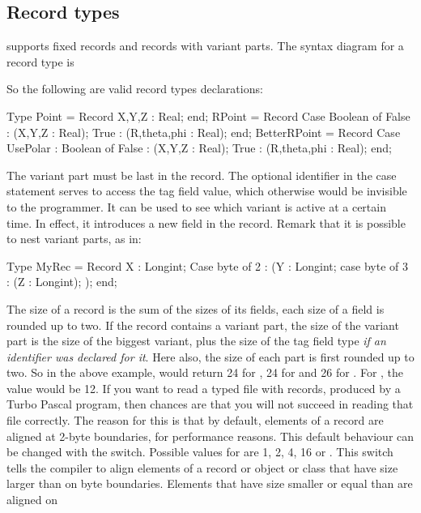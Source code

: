 \documentclass{report}
\begin{document}
\subsection{Record types}
\fpc supports fixed records and records with variant parts. 
The syntax diagram for a record type is

So the following are valid record types declarations:
\begin{listing}
Type
  Point = Record
          X,Y,Z : Real;
          end;
  RPoint = Record
          Case Boolean of
          False : (X,Y,Z : Real);
          True : (R,theta,phi : Real);
          end;
  BetterRPoint = Record
          Case UsePolar : Boolean of
          False : (X,Y,Z : Real);
          True : (R,theta,phi : Real);
          end;
\end{listing}
The variant part must be last in the record. The optional identifier in the
case statement serves to access the tag field value, which otherwise would
be invisible to the programmer. It can be used to see which variant is 
active at a certain time. In effect, it introduces a new field in the
record.
Remark that it is possible to  nest variant parts, as in:
\begin{listing}
Type
  MyRec = Record
          X : Longint;
          Case byte of
            2 : (Y : Longint;
                 case byte of
                 3 : (Z : Longint);
                 );
          end;     
\end{listing}
The size of a record is the sum of the sizes of its fields, each size of a
field is rounded up to two. If the record contains a variant part, the size
of the variant part is the size of the biggest variant, plus the size of the
tag field type {\em if an identifier was declared for it}. Here also, the size of 
each part is first rounded up to two. So in the above example, 
 would return 24 for , 24 for  and 
26 for . For , the value would be 12.
If you want to read a typed file with records, produced by
a Turbo Pascal program, then chances are that you will not succeed in
reading that file correctly.
The reason for this is that by default, elements of a record are aligned at
2-byte boundaries, for performance reasons. This default behaviour can be
changed with the  switch. Possible values for
 are 1, 2, 4, 16 or . 
This switch tells the compiler to align elements of a record or object or 
class that have size larger than  on  byte boundaries.
Elements that have size smaller or equal than  are aligned on 
\end{document}
